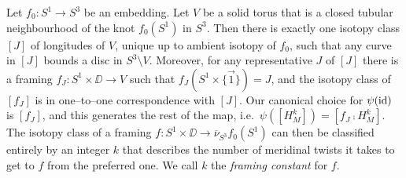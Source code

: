 Let $f_0:S^1\to S^3$ be an embedding.
Let $V$ be a solid torus that is a closed tubular neighbourhood of the knot $f_0(S^1)$ in $S^3$.
Then there is exactly one isotopy class $[J]$ of longitudes of $V$, unique up to ambient isotopy of $f_0$, such that any curve in $[J]$ bounds a disc in $S^3\setminus V$.
Moreover, for any representative $J$ of $[J]$ there is a framing $f_J:S^1\times\DD\to V$ such that $f_J(S^1\times\{\vec{1}\})=J$, and the isotopy class of $[f_J]$ is in one--to--one correspondence with $[J]$.
Our canonical choice for $\psi(\mathrm{id})$ is $[f_J]$, and this generates the rest of the map, i.e.\ $\psi([H_M^k])=[f_J\comp H_M^k]$.
The isotopy class of a framing $f:S^1\times\DD\to\overline{\nu}_{S^3}f_0(S^1)$ can then be classified entirely by an integer $k$ that describes the number of meridinal twists it takes to get to $f$ from the preferred one.
We call $k$ the \emph{framing constant} for $f$.

